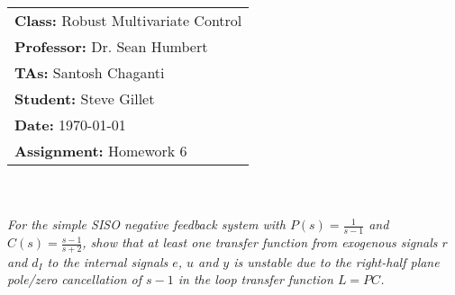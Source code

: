 \documentclass{article}
\begin{document}
\title{
    \begin{tabular}{@{}l@{}}
        \textbf{Class:} Robust Multivariate Control \\
        \textbf{Professor:} Dr. Sean Humbert \\
        \textbf{TAs:} Santosh Chaganti \\
        \textbf{Student:} Steve Gillet \\
        \textbf{Date:} \today \\
        \textbf{Assignment:} Homework 6
    \end{tabular}
}

\author{}
\date{}

\maketitle

\section{}

\textit{For the simple SISO negative feedback system with \(P(s) = \frac{1}{s-1}\) and \(C(s) = \frac{s-1}{s+2}\), show that at least one transfer function from exogenous signals \(r\) and \(d_I\) to the internal signals \(e\), \(u\) and \(y\) is unstable due to the right-half plane pole/zero cancellation of \(s - 1\) in the loop transfer function \(L = PC\).}
\end{document}
